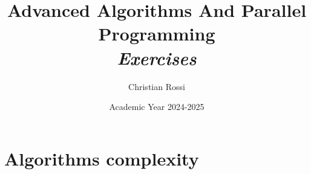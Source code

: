 \documentclass[12pt, a4paper]{report}
\title{\textbf{Advanced Algorithms And Parallel Programming} \\ \textit{Exercises}}
\author{Christian Rossi}
\date{Academic Year 2024-2025}
\begin{document}
    \maketitle

    

    \cleardoublepage

    \tableofcontents

    \cleardoublepage

    \chapter{Algorithms complexity}
\end{document}
